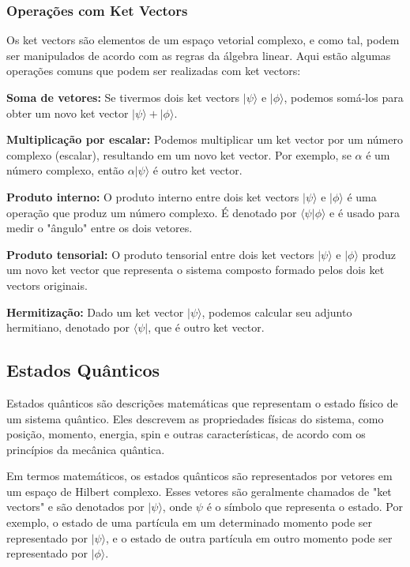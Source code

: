 \documentclass[12pt]{article}
\begin{document}
\subsubsection{Operações com Ket Vectors}


Os ket vectors são elementos de um espaço vetorial complexo, e como tal, podem ser manipulados de acordo com as regras da álgebra linear. Aqui estão algumas operações comuns que podem ser realizadas com ket vectors:

\textbf{Soma de vetores:} Se tivermos dois ket vectors $|\psi\rangle$ e $|\phi\rangle$, podemos somá-los para obter um novo ket vector $|\psi\rangle + |\phi\rangle$.

\textbf{Multiplicação por escalar:} Podemos multiplicar um ket vector por um número complexo (escalar), resultando em um novo ket vector. Por exemplo, se $\alpha$ é um número complexo, então $\alpha|\psi\rangle$ é outro ket vector.

\textbf{Produto interno:} O produto interno entre dois ket vectors $|\psi\rangle$ e $|\phi\rangle$ é uma operação que produz um número complexo. É denotado por $\langle\psi|\phi\rangle$ e é usado para medir o "ângulo" entre os dois vetores.

\textbf{Produto tensorial:} O produto tensorial entre dois ket vectors $|\psi\rangle$ e $|\phi\rangle$ produz um novo ket vector que representa o sistema composto formado pelos dois ket vectors originais.

\textbf{Hermitização:} Dado um ket vector $|\psi\rangle$, podemos calcular seu adjunto hermitiano, denotado por $\langle\psi|$, que é outro ket vector.

\subsection{Estados Quânticos}

Estados quânticos são descrições matemáticas que representam o estado físico de um sistema quântico. Eles descrevem as propriedades físicas do sistema, como posição, momento, energia, spin e outras características, de acordo com os princípios da mecânica quântica.

Em termos matemáticos, os estados quânticos são representados por vetores em um espaço de Hilbert complexo. Esses vetores são geralmente chamados de "ket vectors" e são denotados por $|\psi\rangle$, onde $\psi$ é o símbolo que representa o estado. Por exemplo, o estado de uma partícula em um determinado momento pode ser representado por $|\psi\rangle$, e o estado de outra partícula em outro momento pode ser representado por $|\phi\rangle$.
\end{document}
